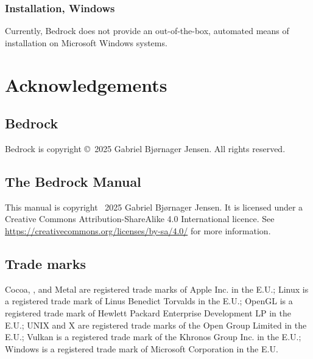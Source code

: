 \documentclass[a5paper, twoside]{report}
\begin{document}
			\subsection{Installation, Windows\textsuperscript{\textregistered}}
				Currently, Bedrock does not provide an out-of-the-box, automated means of installation on Microsoft Windows systems.

	\clearpage
	\chapter{Acknowledgements}
		\section{Bedrock}
			Bedrock is copyright \copyright\ 2025 Gabriel Bjørnager Jensen.
			All rights reserved.

		\section{The Bedrock Manual}
			This manual is copyright \textcopyright\ 2025 Gabriel Bjørnager Jensen.
			It is licensed under a Creative Commons Attribution-ShareAlike 4.0 International licence.
			See \url{https://creativecommons.org/licenses/by-sa/4.0/} for more information.

		\section{Trade marks}
			Cocoa, , and Metal are registered trade marks of Apple Inc. in the E.U.;
			Linux is a registered trade mark of Linus Benedict Torvalds in the E.U.;
			OpenGL is a registered trade mark of Hewlett Packard Enterprise Development LP in the E.U.;
			UNIX and X are registered trade marks of the Open Group Limited in the E.U.;
			Vulkan is a registered trade mark of the Khronos Group Inc. in the E.U.;
			Windows is a registered trade mark of Microsoft Corporation in the E.U.
\end{document}
